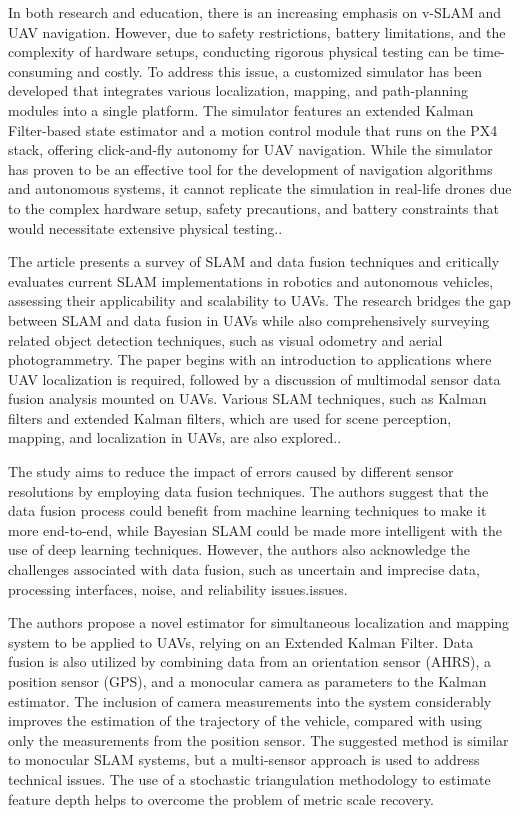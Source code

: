 \documentclass[conference]{IEEEtran}
\begin{document}
In both research and education, there is an increasing emphasis on v-SLAM and UAV navigation. However, due to safety restrictions, battery limitations, and the complexity of hardware setups, conducting rigorous physical testing can be time-consuming and costly. To address this issue, a customized simulator has been developed that integrates various localization, mapping, and path-planning modules into a single platform. The simulator features an extended Kalman Filter-based state estimator and a motion control module that runs on the PX4 stack, offering click-and-fly autonomy for UAV navigation. While the simulator has proven to be an effective tool for the development of navigation algorithms and autonomous systems, it cannot replicate the simulation in real-life drones due to the complex hardware setup, safety precautions, and battery constraints that would necessitate extensive physical testing.\cite{zhou2018routing}.




The article presents a survey of SLAM and data fusion techniques and critically evaluates current SLAM implementations in robotics and autonomous vehicles, assessing their applicability and scalability to UAVs. The research bridges the gap between SLAM and data fusion in UAVs while also comprehensively surveying related object detection techniques, such as visual odometry and aerial photogrammetry. The paper begins with an introduction to applications where UAV localization is required, followed by a discussion of multimodal sensor data fusion analysis mounted on UAVs. Various SLAM techniques, such as Kalman filters and extended Kalman filters, which are used for scene perception, mapping, and localization in UAVs, are also explored.\cite{wang2018survey}.

The study aims to reduce the impact of errors caused by different sensor resolutions by employing data fusion techniques. The authors suggest that the data fusion process could benefit from machine learning techniques to make it more end-to-end, while Bayesian SLAM could be made more intelligent with the use of deep learning techniques. However, the authors also acknowledge the challenges associated with data fusion, such as uncertain and imprecise data, processing interfaces, noise, and reliability issues.issues\cite{kegeleirs2021swarm}.




The authors propose a novel estimator for simultaneous localization and mapping system to be applied to UAVs, relying on an Extended Kalman Filter. Data fusion is also utilized by combining data from an orientation sensor (AHRS), a position sensor (GPS), and a monocular camera as parameters to the Kalman estimator. The inclusion of camera measurements into the system considerably improves the estimation of the trajectory of the vehicle, compared with using only the measurements from the position sensor. The suggested method is similar to monocular SLAM systems, but a multi-sensor approach is used to address technical issues. The use of a stochastic triangulation methodology to estimate feature depth helps to overcome the problem of metric scale recovery.
\end{document}
